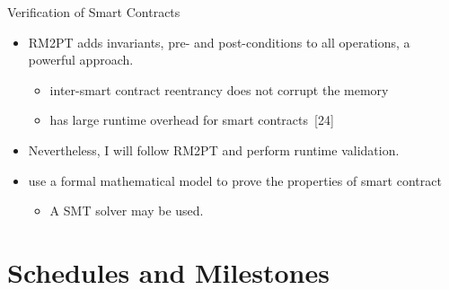 \documentclass[xcolor=svgnames]{beamer}
\begin{document}
\begin{frame}{Verification of Smart Contracts}
\begin{itemize}
\item RM2PT adds invariants, pre- and post-conditions to all operations, a powerful approach.
	\begin{itemize}
	\item inter-smart contract reentrancy does not corrupt the memory
	\item has large runtime overhead for smart contracts~[24]
	\end{itemize}

\item<2-> Nevertheless, I will follow RM2PT and perform runtime validation.

\item<3-> use a formal mathematical model to prove the properties of smart contract
	\begin{itemize}
	\item A SMT solver may be used.
	\end{itemize}
\end{itemize}

\end{frame}

\section{Schedules and Milestones}
\end{document}
